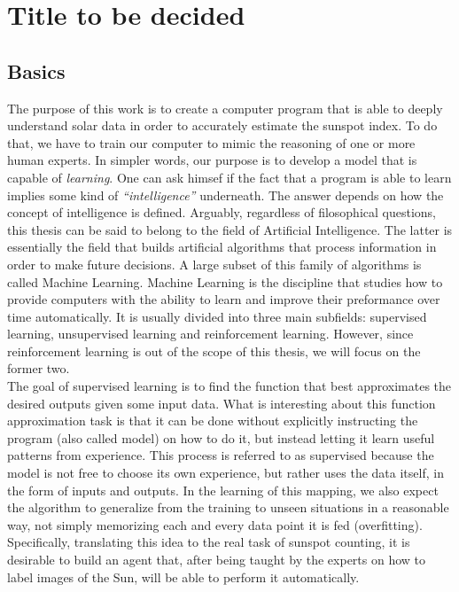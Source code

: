 \chapter{Title to be decided}
\label{capitolo4}
\thispagestyle{empty}

\section{Basics}
\noindent The purpose of this work is to create a computer program that is able to deeply understand solar data in order to accurately estimate the sunspot index. To do that, we have to train our computer to mimic the reasoning of one or more human experts. In simpler words, our purpose is to develop a model that is capable of \textit{learning}. One can ask himsef if the fact that a program is able to learn implies some kind of \textit{``intelligence''} underneath. The answer depends on how the concept of intelligence is defined. Arguably, regardless of filosophical questions, this thesis can be said to belong to the field of Artificial Intelligence. The latter is essentially the field that builds artificial algorithms that process information in order to make future decisions. A large subset of this family of algorithms is called Machine Learning. Machine Learning is the discipline that studies how to provide computers with the ability to learn and improve their preformance over time automatically. It is usually divided into three main subfields: supervised learning, unsupervised learning and reinforcement learning. However, since reinforcement learning is out of the scope of this thesis, we will focus on the former two. \\
The goal of supervised learning is to find the function that best approximates the desired outputs given some input data. What is interesting about this function approximation task is that it can be done without explicitly instructing the program (also called model) on how to do it, but instead letting it learn useful patterns from experience. This process is referred to as supervised because the model is not free to choose its own experience, but rather uses the data itself, in the form of inputs and outputs. In the learning of this mapping, we also expect the algorithm to generalize from the training to unseen situations in a reasonable way, not simply memorizing each and every data point it is fed (overfitting). Specifically, translating this idea to the real task of sunspot counting, it is desirable to build an agent that, after being taught by the experts on how to label images of the Sun, will be able to perform it automatically.\\
